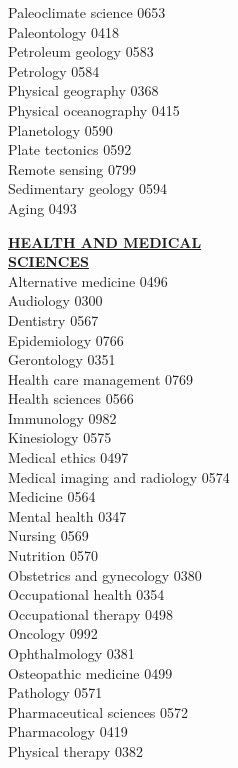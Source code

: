 \documentclass[9pt,twoside]{article}
\newcommand{\categoryheading}[1]{{\fontsize{8}{11}\selectfont \textbf{\uline{#1}}}}
\begin{document}
{\begin{multicols}{3}
Paleoclimate science \hfill 0653 \\
Paleontology \hfill 0418 \\
Petroleum geology \hfill 0583 \\
Petrology \hfill 0584 \\
Physical geography \hfill 0368 \\
Physical oceanography \hfill 0415 \\
Planetology \hfill 0590 \\
Plate tectonics \hfill 0592 \\
Remote sensing \hfill 0799 \\
Sedimentary geology \hfill 0594 \\
Aging \hfill 0493

\categoryheading{HEALTH AND MEDICAL \\
SCIENCES} \\
Alternative medicine \hfill 0496 \\
Audiology \hfill 0300 \\
Dentistry \hfill 0567 \\
Epidemiology \hfill 0766 \\
Gerontology \hfill 0351 \\
Health care management \hfill 0769 \\
Health sciences \hfill 0566 \\
Immunology \hfill 0982 \\
Kinesiology \hfill 0575 \\
Medical ethics \hfill 0497 \\
Medical imaging and radiology \hfill 0574 \\
Medicine \hfill 0564 \\
Mental health \hfill 0347 \\
Nursing \hfill 0569 \\
Nutrition \hfill 0570 \\
Obstetrics and gynecology \hfill 0380 \\
Occupational health \hfill 0354 \\
Occupational therapy \hfill 0498 \\
Oncology \hfill 0992 \\
Ophthalmology \hfill 0381 \\
Osteopathic medicine \hfill 0499 \\
Pathology \hfill 0571 \\
Pharmaceutical sciences \hfill 0572 \\
Pharmacology \hfill 0419 \\
Physical therapy \hfill 0382 \\

\end{multicols}}
\end{document}

